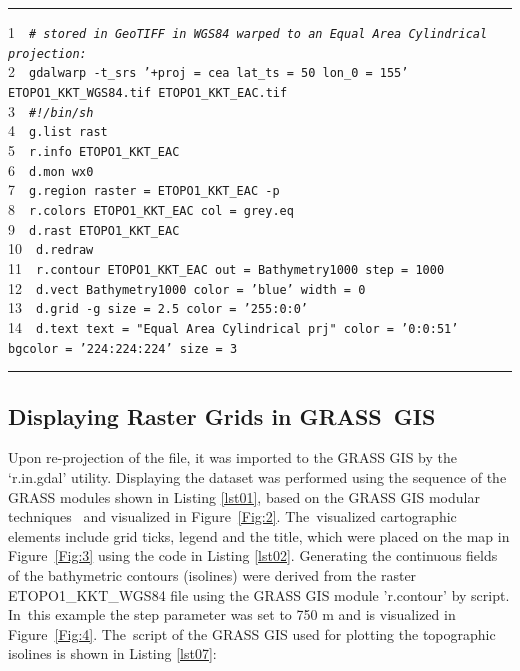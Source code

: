 \documentclass[technologies,article,accept,pdftex,moreauthors]{Definitions/mdpi}
\begin{document}
\begin{listing}[H]
\caption{GRASS GIS %
 script for plotting map in Equal-Area Cylindrical projection.}\label{lst06}
\rule{\columnwidth}{1pt}
\raggedright
1~~\texttt{\emph{\# stored in GeoTIFF in WGS84 warped to an Equal Area Cylindrical projection:\\}}
2~~\texttt{gdalwarp -t\_srs '+proj = cea lat\_ts = 50 lon\_0 = 155' ETOPO1\_KKT\_WGS84.tif ETOPO1\_KKT\_EAC.tif\\}
3~~\texttt{\emph{\#!/bin/sh\\}}
4~~\texttt{g.list rast\\}
5~~\texttt{r.info ETOPO1\_KKT\_EAC\\}
6~~\texttt{d.mon wx0\\}
7~~\texttt{g.region raster = ETOPO1\_KKT\_EAC -p\\}
8~~\texttt{r.colors ETOPO1\_KKT\_EAC col = grey.eq\\}
9~~\texttt{d.rast ETOPO1\_KKT\_EAC\\}
10~~\texttt{d.redraw\\}
11~~\texttt{r.contour ETOPO1\_KKT\_EAC out = Bathymetry1000 step = 1000\\}
12~~\texttt{d.vect Bathymetry1000 color = 'blue' width = 0\\}
13~~\texttt{d.grid -g size = 2.5 color = '255:0:0'\\}
14~~\texttt{d.text text = "Equal Area Cylindrical prj" color = '0:0:51' bgcolor = '224:224:224' size = 3\\}
\rule{\columnwidth}{1pt}
\end{listing}

\subsection{Displaying Raster Grids in GRASS~GIS}

Upon re-projection of the file, it was imported to the GRASS GIS by the ‘r.in.gdal’ utility. Displaying the dataset was performed using the sequence of the GRASS modules shown in Listing \ref{lst01}, based on the GRASS GIS modular techniques~\cite{Brown} and visualized in Figure~\ref{Fig:2}. The~visualized cartographic elements include grid ticks, legend and the title, which were placed on the map in Figure~\ref{Fig:3} using the code in Listing \ref{lst02}. Generating the continuous fields of the bathymetric contours (isolines) were derived from the raster ETOPO1\_KKT\_WGS84 file using the GRASS GIS module 'r.contour' by script. In~this example the step parameter was set to 750 m and is visualized in Figure~\ref{Fig:4}. The~script of the GRASS GIS used for plotting the topographic isolines is shown in Listing \ref{lst07}:
\end{document}
